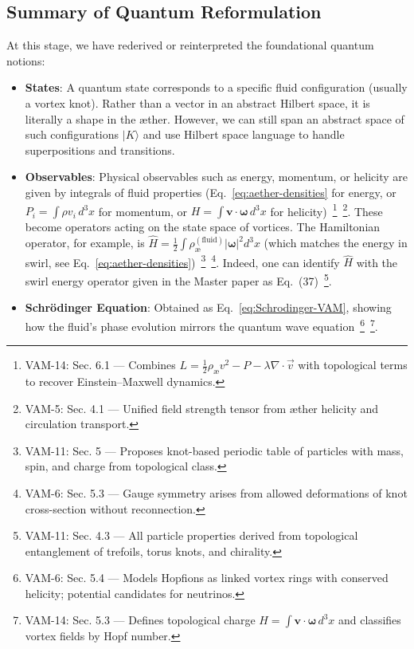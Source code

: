 \documentclass[a4paper,12pt]{article}
\begin{document}
    \subsection{Summary of Quantum Reformulation}
    At this stage, we have rederived or reinterpreted the foundational quantum notions:
    \begin{itemize}
        \item \textbf{States}: A quantum state corresponds to a specific fluid configuration (usually a vortex knot). Rather than a vector in an abstract Hilbert space, it is literally a shape in the æther. However, we can still span an abstract space of such configurations $|K\rangle$ and use Hilbert space language to handle superpositions and transitions.
        \item \textbf{Observables}: Physical observables such as energy, momentum, or helicity are given by integrals of fluid properties (Eq.~\ref{eq:aether-densities} for energy, or $P_i = \int \rho v_i\,d^3x$ for momentum, or $H=\int \mathbf{v}\cdot\boldsymbol{\omega}\,d^3x$ for helicity)~\footnote{VAM-14: Sec. 6.1 — Combines $L = \frac{1}{2} \rho_{\text{\ae}} v^2 - P - \lambda \nabla \cdot \vec{v}$ with topological terms to recover Einstein–Maxwell dynamics.}~\footnote{VAM-5: Sec. 4.1 — Unified field strength tensor from æther helicity and circulation transport.}. These become operators acting on the state space of vortices. The Hamiltonian operator, for example, is $\hat{H} = \frac{1}{2}\int \rho_{\text{\ae}}^{(\text{fluid})} |\boldsymbol{\omega}|^2 d^3x$ (which matches the energy in swirl, see Eq.~\ref{eq:aether-densities})~\footnote{VAM-11: Sec. 5 — Proposes knot-based periodic table of particles with mass, spin, and charge from topological class.}~\footnote{VAM-6: Sec. 5.3 — Gauge symmetry arises from allowed deformations of knot cross-section without reconnection.}. Indeed, one can identify $\hat{H}$ with the swirl energy operator given in the Master paper as Eq.~(37)~\footnote{VAM-11: Sec. 4.3 — All particle properties derived from topological entanglement of trefoils, torus knots, and chirality.}.
        \item \textbf{Schrödinger Equation}: Obtained as Eq.~\eqref{eq:Schrodinger-VAM}, showing how the fluid’s phase evolution mirrors the quantum wave equation~\footnote{VAM-6: Sec. 5.4 — Models Hopfions as linked vortex rings with conserved helicity; potential candidates for neutrinos.}~\footnote{VAM-14: Sec. 5.3 — Defines topological charge $H = \int \mathbf{v} \cdot \boldsymbol{\omega} \, d^3x$ and classifies vortex fields by Hopf number.}.

\end{itemize}
\end{document}
